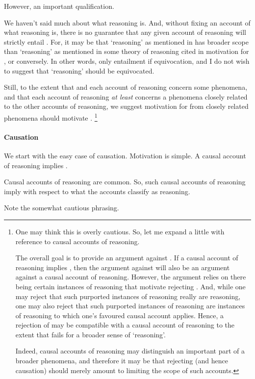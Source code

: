\begin{note}[Qualification]
  However, an important qualification.

  We haven't said much about what reasoning is.
  And, without fixing an account of what reasoning is, there is no guarantee that any given account of reasoning will strictly entail \ESU{}.
  For, it may be that `reasoning' as mentioned in \ESU{} has broader scope than `reasoning' as mentioned in some theory of reasoning cited in motivation for \ESU{}, or conversely.
  In other words, only entailment if equivocation, and I do not wish to suggest that `reasoning' should be equivocated.

  Still, to the extent that \ESU{} and each account of reasoning concern some phenomena, and that each account of reasoning \emph{at least} concerns a phenomena closely related to the other accounts of reasoning, we suggest motivation for \ESU{} from closely related phenomena should motivate \ESU{}.\nolinebreak
  \footnote{
    One may think this is overly cautious.
    So, let me expand a little with reference to causal accounts of reasoning.

    The overall goal is to provide an argument against \ESU{}.
    If a causal account of reasoning implies \ESU{}, then the argument against \ESU{} will also be an argument against a causal account of reasoning.
    However, the argument relies on there being certain instances of reasoning that motivate rejecting \ESU{}.
    And, while one may reject that such purported instances of reasoning really are reasoning, one may also reject that such purported instances of reasoning are instances of reasoning to which one's favoured causal account applies.
    Hence, a rejection of \ESU{} may be compatible with a causal account of reasoning to the extent that \ESU{} fails for a broader sense of `reasoning'.

    Indeed, causal accounts of reasoning may distinguish an important part of a broader phenomena, and therefore it may be that rejecting \ESU{} (and hence causation) should merely amount to limiting the scope of such accounts.
  }
\end{note}

\paragraph{Causation}
\label{sec:motivating-ESU:causation}

\begin{note}
  We start with the easy case of causation.
  Motivation is simple.
  A causal account of reasoning implies \ESU{}.

  Causal accounts of reasoning are common.
  So, such causal accounts of reasoning imply \ESU{} with respect to what the accounts classify as reasoning.

  Note the somewhat cautious phrasing.
\end{note}

